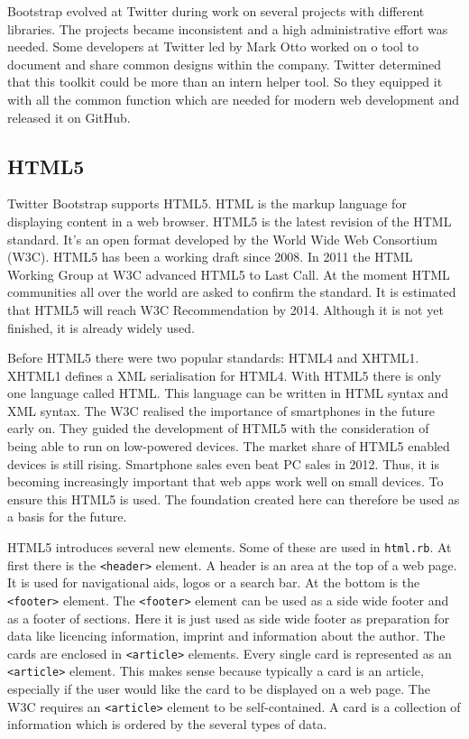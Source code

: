 Bootstrap evolved at Twitter during work on several projects with different libraries. The projects became inconsistent and a high administrative effort was needed. Some developers at Twitter led by Mark Otto worked on o tool to document and share common designs within the company. Twitter determined that this toolkit could be more than an intern helper tool. So they equipped it with all the common function which are needed for modern web development and released it on GitHub. \cite{markotto}

\subsection{HTML5}
Twitter Bootstrap supports HTML5. HTML is the markup language for displaying content in a web browser. HTML5 is the latest revision of the HTML standard. It's an open format developed by the World Wide Web Consortium (W3C). HTML5 has been a working draft since 2008. In 2011 the HTML Working Group at W3C advanced HTML5 to Last Call. At the moment HTML communities all over the world are asked to confirm the standard.  It is estimated that HTML5 will reach W3C Recommendation by 2014.\cite{html:lastcall} Although it is not yet finished, it is already widely used.

Before HTML5  there were two popular standards: HTML4 and XHTML1. XHTML1 defines a XML serialisation for HTML4. With HTML5 there is only one language called HTML. This language can be written in HTML syntax and XML syntax. 
\cite{html:5differences} The W3C realised the importance of smartphones in the future early on. They guided the development of HTML5 with the consideration of being able to run on low-powered devices. The market share of HTML5 enabled devices is still rising. \cite{smartphonesales} Smartphone sales even beat PC sales in 2012. Thus, it is becoming increasingly important that web apps work well on small devices. To ensure this HTML5 is used. The foundation created here can therefore be used as a basis for the future.

HTML5 introduces several new elements. Some of these are used in \texttt{html.rb}. At first there is the \lstinline{<header>} element. A header is an area at the top of a web page. It is used for navigational aids, logos or a search bar. \cite{html5:header} At the bottom is the \lstinline{<footer>} element. The \lstinline{<footer>} element can be used as a side wide footer and as a footer of sections. \cite{html5:footer} Here it is just used as side wide footer as preparation for data like licencing information, imprint and information about the author. The cards are enclosed in \lstinline{<article>} elements. Every single card is represented as an \lstinline{<article>} element. This makes sense because typically a card is an article, especially if the user would like the card to be displayed on a web page. The W3C requires an \lstinline{<article>} element to be self-contained. \cite{html5:article} A card is a collection of information which is ordered by the several types of data. 

